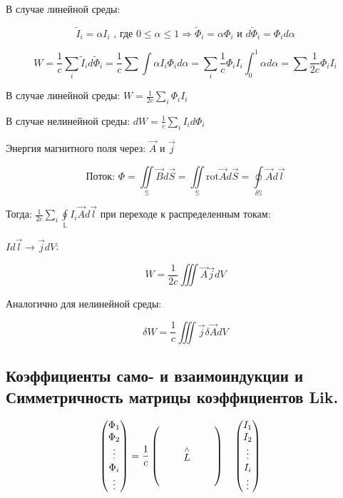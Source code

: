 В случае линейной среды:

\[
\tilde{I}_i=\alpha I_i \text{ , где }0\leqslant \alpha\leqslant 1 \Rightarrow \tilde{\Phi}_i=\alpha \Phi_i \text{ и } d\tilde{\Phi}_i=\Phi_i d\alpha
\]

\[
W=\frac{1}{c} \sum_{i}\tilde{I}_id\tilde{\Phi}_i=\frac{1}{c}\sum \int \alpha I_i \Phi_i d\alpha=\sum_{i}\frac{1}{c}\Phi_i I_i \int_{0}^1\alpha d\alpha=\sum \frac{1}{2c}\Phi_i I_i    
\]

В случае линейной среды: \( \boxed{W=\frac{1}{2c}\sum_{i}\Phi_iI_i } \) 

В случае нелинейной среды: \( \boxed{dW=\frac{1}{c}\sum_{i}I_id\Phi_i } \) 

Энергия магнитного поля через: \( \vec{A} \text{ и } \vec{j} \) 

\[
\text{Поток: } \Phi=\underset{\mathbb{S}}{\iint}\vec{B}d\vec{S}=\underset{\mathbb{S}}{\iint}\mathrm{rot}\vec{A}d\vec{S}=\underset{\delta\mathbb{S}}{\oint}\vec{A}d\vec{l} 
\]

Тогда: \( \frac{1}{2c}\sum_{i}\underset{\mathbb{L}}{\oint}I_i \vec{A}d\vec{l}  \) при переходе к распределенным токам: 

\( Id\vec{l}\rightarrow\vec{j}dV \):

\[
\boxed{W=\frac{1}{2c}\iiint \vec{A}\vec{j}dV }
\]

Аналогично для нелинейной среды: 

\[
\boxed{\delta W=\frac{1}{c}\iiint \vec{j}\delta \vec{A} dV }
\]

\subsection*{Коэффициенты само-
и взаимоиндукции и Симметричность матрицы коэффициентов Lik.}

\[
    \begin{pmatrix}
        \Phi_1 \\
        \Phi_2 \\
        \vdots \\
        \Phi_i \\
        \vdots
        \end{pmatrix}
        =
        \renewcommand{\arraystretch}{1.8} %
        \setlength{\arraycolsep}{1.2em}   %
        \frac{1}{c} 
        \begin{pmatrix}
           &   &   \\
           & \overset{\wedge}{L} &   \\
           &   &  
        \end{pmatrix}
        \quad
        \renewcommand{\arraystretch}{1.} 
        \setlength{\arraycolsep}{1.2em}   
        \begin{pmatrix}
        I_1 \\
        I_2 \\
        \vdots \\
        I_i \\
        \vdots
        \end{pmatrix}
        \quad
\]

